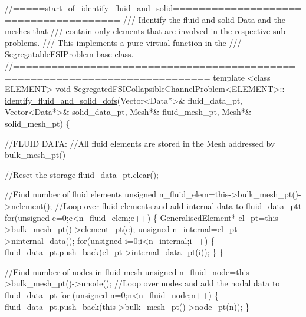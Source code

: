  
\begin{DoxyCodeInclude}
\textcolor{comment}{//=====start\_of\_identify\_fluid\_and\_solid======================================}
\textcolor{comment}{/// Identify the fluid and solid Data and the meshes that}
\textcolor{comment}{}\textcolor{comment}{/// contain only elements that are involved in the respective sub-problems. }
\textcolor{comment}{}\textcolor{comment}{/// This implements a pure virtual function in the }
\textcolor{comment}{}\textcolor{comment}{/// SegregatableFSIProblem base class.}
\textcolor{comment}{}\textcolor{comment}{//============================================================================}
\textcolor{keyword}{template} <\textcolor{keyword}{class} ELEMENT>
\textcolor{keywordtype}{void} \hyperlink{classSegregatedFSICollapsibleChannelProblem_aa473522c98c5b70b8d35c0a7cdb1e42c}{SegregatedFSICollapsibleChannelProblem<ELEMENT>::}
\hyperlink{classSegregatedFSICollapsibleChannelProblem_aa473522c98c5b70b8d35c0a7cdb1e42c}{identify\_fluid\_and\_solid\_dofs}(Vector<Data*>& fluid\_data\_pt,
                              Vector<Data*>& solid\_data\_pt,
                              Mesh*& fluid\_mesh\_pt,
                              Mesh*& solid\_mesh\_pt)
\{

 \textcolor{comment}{//FLUID DATA: }
 \textcolor{comment}{//All fluid elements are stored in the Mesh addressed by bulk\_mesh\_pt() }

 \textcolor{comment}{//Reset the storage}
 fluid\_data\_pt.clear();

 \textcolor{comment}{//Find number of fluid elements}
 \textcolor{keywordtype}{unsigned} n\_fluid\_elem=this->bulk\_mesh\_pt()->nelement();
 \textcolor{comment}{//Loop over fluid elements and add internal data to fluid\_data\_ptt}
 \textcolor{keywordflow}{for}(\textcolor{keywordtype}{unsigned} e=0;e<n\_fluid\_elem;e++)
  \{
   GeneralisedElement* el\_pt=this->bulk\_mesh\_pt()->element\_pt(e);
   \textcolor{keywordtype}{unsigned} n\_internal=el\_pt->ninternal\_data();
   \textcolor{keywordflow}{for}(\textcolor{keywordtype}{unsigned} i=0;i<n\_internal;i++)
    \{
     fluid\_data\_pt.push\_back(el\_pt->internal\_data\_pt(i));
    \}
  \}
 
 \textcolor{comment}{//Find number of nodes in fluid mesh}
 \textcolor{keywordtype}{unsigned} n\_fluid\_node=this->bulk\_mesh\_pt()->nnode();
 \textcolor{comment}{//Loop over nodes and add the nodal data to fluid\_data\_pt}
 \textcolor{keywordflow}{for} (\textcolor{keywordtype}{unsigned} n=0;n<n\_fluid\_node;n++)
  \{
   fluid\_data\_pt.push\_back(this->bulk\_mesh\_pt()->node\_pt(n));
  \}
  

\end{DoxyCodeInclude}
